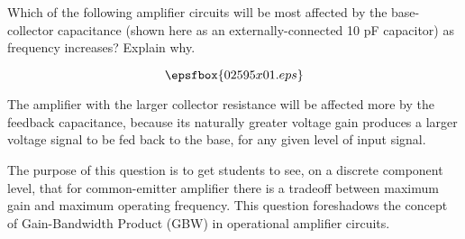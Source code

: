 

Which of the following amplifier circuits will be most affected by the base-collector capacitance (shown here as an externally-connected 10 pF capacitor) as frequency increases?  Explain why.

$$\epsfbox{02595x01.eps}$$







The amplifier with the larger collector resistance will be affected more by the feedback capacitance, because its naturally greater voltage gain produces a larger voltage signal to be fed back to the base, for any given level of input signal.







The purpose of this question is to get students to see, on a discrete component level, that for common-emitter amplifier there is a tradeoff between maximum gain and maximum operating frequency.  This question foreshadows the concept of Gain-Bandwidth Product (GBW) in operational amplifier circuits.




